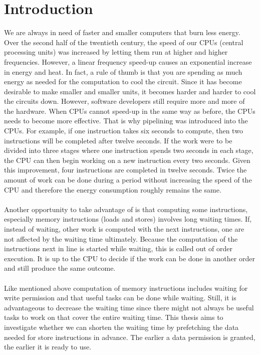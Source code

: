 \chapter{Introduction}
\label{chap:In}
We are always in need of faster and smaller computers that burn less energy. Over
the second half of the twentieth century, the speed of our CPUs (central processing units)
was increased by letting them run at higher and higher frequencies. However, a linear
frequency speed-up causes an exponential increase in energy and heat. In fact, a rule of thumb
is that you are spending as much energy as needed for the computation to cool the
circuit. Since it has become desirable to make smaller and smaller units, it becomes harder and harder
to cool the circuits down. However, software developers still
require more and more of the hardware. When CPUs cannot speed-up
in the same way as before, the CPUs needs to become more effective. That is why
pipelining was introduced into the CPUs. For example, if one instruction takes six seconds to compute, then two instructions will be completed after twelve seconds. If the work were to be divided into three stages where one instruction spends two seconds in each stage, the CPU can then begin working on a new instruction every two seconds. Given this improvement, four instructions are completed in twelve seconds.
Twice the amount of work can be done during a period without increasing the speed
of the CPU and therefore the energy consumption roughly remains the same.
\\ \\
Another opportunity to take advantage of is that computing some instructions, especially
memory instructions (loads and stores) involves long waiting times. If, instead of waiting, other work is computed with the next instructions, one are not affected by the waiting time ultimately. Because the computation of the instructions next in line is started while waiting, this is called out of order execution. It is up to the CPU to decide if the work can be done in another order and still produce the same outcome. 
\\ \\
Like mentioned above computation of memory instructions includes waiting for write permission and that useful tasks can be done while waiting. Still, it is advantageous to decrease the waiting time since there might not always be useful tasks to work on that cover the entire waiting time. This thesis aims to investigate whether we can shorten the waiting time by prefetching the data needed for store instructions in advance. The earlier a data permission is granted, the earlier it is ready to use.
